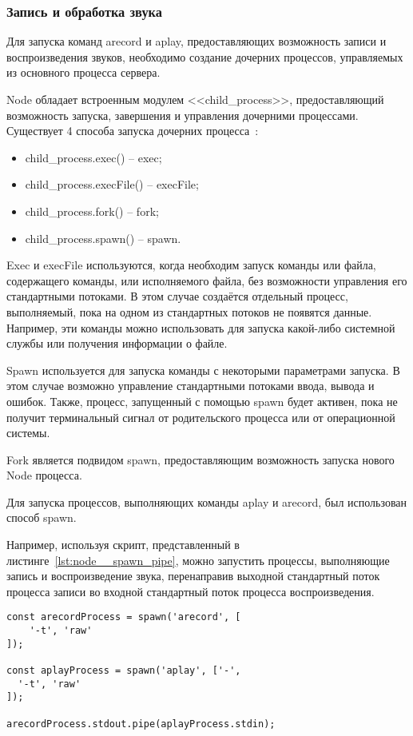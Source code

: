 \subsubsection{Запись и обработка звука}

Для запуска команд arecord и aplay, предоставляющих возможность записи и воспроизведения звуков, необходимо создание дочерних процессов, управляемых из основного процесса сервера.

Node обладает встроенным модулем <<child\_process>>, предоставляющий возможность запуска, завершения и управления дочерними процессами. Существует 4 способа запуска дочерних процесса~\cite{node}:

\begin{itemize}
  \item child\_process.exec() -- exec;
  \item child\_process.execFile() -- execFile;
  \item child\_process.fork() -- fork;
  \item child\_process.spawn() -- spawn.
\end{itemize}

Exec и execFile используются, когда необходим запуск команды или файла, содержащего команды, или исполняемого файла, без возможности управления его стандартными потоками. В этом случае создаётся отдельный процесс, выполняемый, пока на одном из стандартных потоков не появятся данные. Например, эти команды можно использовать для запуска какой-либо системной службы или получения информации о файле.

Spawn используется для запуска команды с некоторыми параметрами запуска. В этом случае возможно управление стандартными потоками ввода, вывода и ошибок. Также, процесс, запущенный с помощью spawn будет активен, пока не получит терминальный сигнал от родительского процесса или от операционной системы.

Fork является подвидом spawn, предоставляющим возможность запуска нового Node процесса.

Для запуска процессов, выполняющих команды aplay и arecord, был использован способ spawn.

Например, используя скрипт, представленный в листинге~\ref{lst:node__spawn_pipe}, можно запустить процессы, выполняющие запись и воспроизведение звука, перенаправив выходной стандартный поток процесса записи во входной стандартный поток процесса воспроизведения.

\begin{lstlisting}[style=ES6, caption={Пример запуска процессов и перенаправления потоков процессов}, label={lst:node__spawn_pipe}]
const arecordProcess = spawn('arecord', [
    '-t', 'raw'
]);

const aplayProcess = spawn('aplay', ['-',
  '-t', 'raw'
]);

arecordProcess.stdout.pipe(aplayProcess.stdin);
\end{lstlisting}

